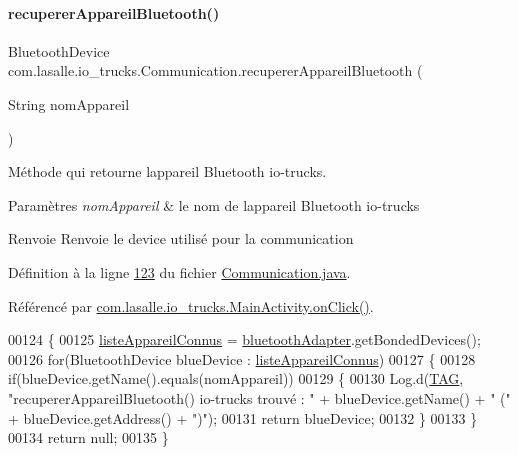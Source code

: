 \paragraph{\texorpdfstring{recuperer\+Appareil\+Bluetooth()}{recupererAppareilBluetooth()}}
{\footnotesize\ttfamily Bluetooth\+Device com.\+lasalle.\+io\+\_\+trucks.\+Communication.\+recuperer\+Appareil\+Bluetooth (\begin{DoxyParamCaption}\item[{String}]{nom\+Appareil }\end{DoxyParamCaption})}



Méthode qui retourne l\textquotesingle{}appareil Bluetooth io-\/trucks. 


\begin{DoxyParams}{Paramètres}
{\em nom\+Appareil} & le nom de l\textquotesingle{}appareil Bluetooth io-\/trucks \\
\hline
\end{DoxyParams}
\begin{DoxyReturn}{Renvoie}
Renvoie le device utilisé pour la communication 
\end{DoxyReturn}


Définition à la ligne \hyperlink{_communication_8java_source_l00123}{123} du fichier \hyperlink{_communication_8java_source}{Communication.\+java}.



Référencé par \hyperlink{_main_activity_8java_source_l00131}{com.\+lasalle.\+io\+\_\+trucks.\+Main\+Activity.\+on\+Click()}.


\begin{DoxyCode}
00124     \{
00125         \hyperlink{classcom_1_1lasalle_1_1io__trucks_1_1_communication_af0441da9cbe4ea858b82214ece930197}{listeAppareilConnus} = \hyperlink{classcom_1_1lasalle_1_1io__trucks_1_1_communication_aab37c21038f7b794ab77e6705b8b5938}{bluetoothAdapter}.getBondedDevices();
00126         \textcolor{keywordflow}{for}(BluetoothDevice blueDevice : \hyperlink{classcom_1_1lasalle_1_1io__trucks_1_1_communication_af0441da9cbe4ea858b82214ece930197}{listeAppareilConnus})
00127         \{
00128             \textcolor{keywordflow}{if}(blueDevice.getName().equals(nomAppareil))
00129             \{
00130                 Log.d(\hyperlink{classcom_1_1lasalle_1_1io__trucks_1_1_communication_aec1062036f071d51a4925a3080d71004}{TAG}, \textcolor{stringliteral}{"recupererAppareilBluetooth() io-trucks trouvé : "} + blueDevice.getName() + \textcolor{stringliteral}{"
       ("} + blueDevice.getAddress() + \textcolor{stringliteral}{")"});
00131                 \textcolor{keywordflow}{return} blueDevice;
00132             \}
00133         \}
00134         \textcolor{keywordflow}{return} null;
00135     \}
\end{DoxyCode}
\mbox{\label{classcom_1_1lasalle_1_1io__trucks_1_1_communication_ad5df5cc22c05d1a2af2b2c0adde57dea}} 
